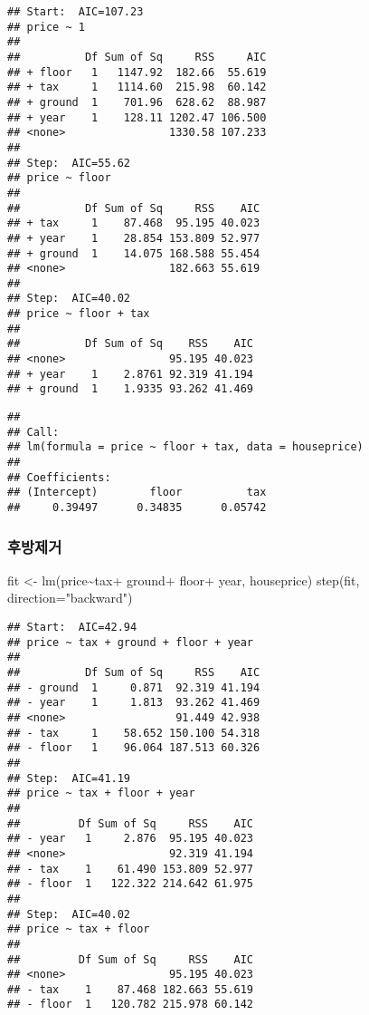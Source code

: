 \documentclass[
]{book}
\newenvironment{Shaded}{\begin{snugshade}}{\end{snugshade}}
\newcommand{\AttributeTok}[1]{\textcolor[rgb]{0.77,0.63,0.00}{#1}}
\newcommand{\FunctionTok}[1]{\textcolor[rgb]{0.00,0.00,0.00}{#1}}
\newcommand{\NormalTok}[1]{#1}
\newcommand{\OtherTok}[1]{\textcolor[rgb]{0.56,0.35,0.01}{#1}}
\newcommand{\SpecialCharTok}[1]{\textcolor[rgb]{0.00,0.00,0.00}{#1}}
\newcommand{\StringTok}[1]{\textcolor[rgb]{0.31,0.60,0.02}{#1}}
\begin{document}
\begin{verbatim}
## Start:  AIC=107.23
## price ~ 1
## 
##          Df Sum of Sq     RSS     AIC
## + floor   1   1147.92  182.66  55.619
## + tax     1   1114.60  215.98  60.142
## + ground  1    701.96  628.62  88.987
## + year    1    128.11 1202.47 106.500
## <none>                1330.58 107.233
## 
## Step:  AIC=55.62
## price ~ floor
## 
##          Df Sum of Sq     RSS    AIC
## + tax     1    87.468  95.195 40.023
## + year    1    28.854 153.809 52.977
## + ground  1    14.075 168.588 55.454
## <none>                182.663 55.619
## 
## Step:  AIC=40.02
## price ~ floor + tax
## 
##          Df Sum of Sq    RSS    AIC
## <none>                95.195 40.023
## + year    1    2.8761 92.319 41.194
## + ground  1    1.9335 93.262 41.469
\end{verbatim}

\begin{verbatim}
## 
## Call:
## lm(formula = price ~ floor + tax, data = houseprice)
## 
## Coefficients:
## (Intercept)        floor          tax  
##     0.39497      0.34835      0.05742
\end{verbatim}

\hypertarget{uxd6c4uxbc29uxc81cuxac70}{%
\subsubsection{후방제거}\label{uxd6c4uxbc29uxc81cuxac70}}

\begin{Shaded}
\begin{Highlighting}[]
\NormalTok{fit }\OtherTok{\textless{}{-}} \FunctionTok{lm}\NormalTok{(price}\SpecialCharTok{\textasciitilde{}}\NormalTok{tax}\SpecialCharTok{+}\NormalTok{ ground}\SpecialCharTok{+}\NormalTok{ floor}\SpecialCharTok{+}\NormalTok{ year, houseprice)}
\FunctionTok{step}\NormalTok{(fit, }\AttributeTok{direction=}\StringTok{"backward"}\NormalTok{)}
\end{Highlighting}
\end{Shaded}

\begin{verbatim}
## Start:  AIC=42.94
## price ~ tax + ground + floor + year
## 
##          Df Sum of Sq     RSS    AIC
## - ground  1     0.871  92.319 41.194
## - year    1     1.813  93.262 41.469
## <none>                 91.449 42.938
## - tax     1    58.652 150.100 54.318
## - floor   1    96.064 187.513 60.326
## 
## Step:  AIC=41.19
## price ~ tax + floor + year
## 
##         Df Sum of Sq     RSS    AIC
## - year   1     2.876  95.195 40.023
## <none>                92.319 41.194
## - tax    1    61.490 153.809 52.977
## - floor  1   122.322 214.642 61.975
## 
## Step:  AIC=40.02
## price ~ tax + floor
## 
##         Df Sum of Sq     RSS    AIC
## <none>                95.195 40.023
## - tax    1    87.468 182.663 55.619
## - floor  1   120.782 215.978 60.142
\end{verbatim}
\end{document}

